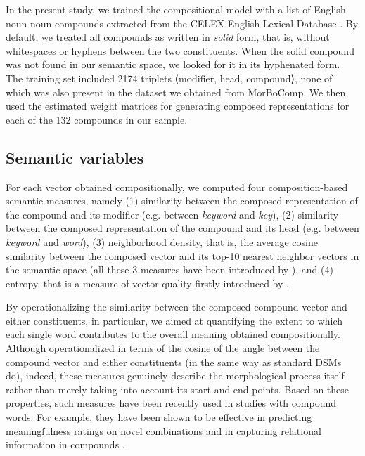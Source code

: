 \documentclass[output=paper]{langsci/langscibook}
\begin{document}
In the present study, we trained the compositional model with a list of English noun-noun compounds extracted from the CELEX English Lexical Database \citep{celex}. By default, we treated all compounds as written in \emph{solid} form, that is, without whitespaces or hyphens between the two constituents. When the solid compound was not found in our semantic space, we looked for it in its hyphenated form. The training set included 2174 triplets ⟨modifier, head, compound⟩, none of which was also present in the dataset we obtained from MorBoComp. We then used the estimated weight matrices for generating composed representations for each of the 132 compounds in our sample.


\subsection{Semantic variables}

For each vector obtained compositionally, we computed four composition-based semantic measures, namely (1) similarity between the composed representation of the compound and its modifier (e.g. between \emph{keyword} and \emph{key}), (2) similarity between the composed representation of the compound and its head (e.g. between \emph{keyword} and \emph{word}), (3) neighborhood density, that is, the average cosine similarity between the composed vector and its top-10 nearest neighbor vectors in the semantic space (all these 3 measures have been introduced by \citealt{vecchi2011}), and (4) entropy, that is a measure of vector quality firstly introduced by \cite{lazaridoufish}.

By operationalizing the similarity between the composed compound vector and either constituents, in particular, we aimed at quantifying the extent to which each single word contributes to the overall meaning obtained compositionally. Although operationalized in terms of the cosine of the angle between the compound vector and either constituents (in the same way as standard DSMs do), indeed, these measures genuinely describe the morphological process itself rather than merely taking into account its start and end points. Based on these properties, such measures have been recently used in studies with compound words. For example, they have been shown to be effective in predicting meaningfulness ratings on novel combinations \citep{gunther2016} and in capturing relational information in compounds \citep{marelli2017}.

\end{document}
